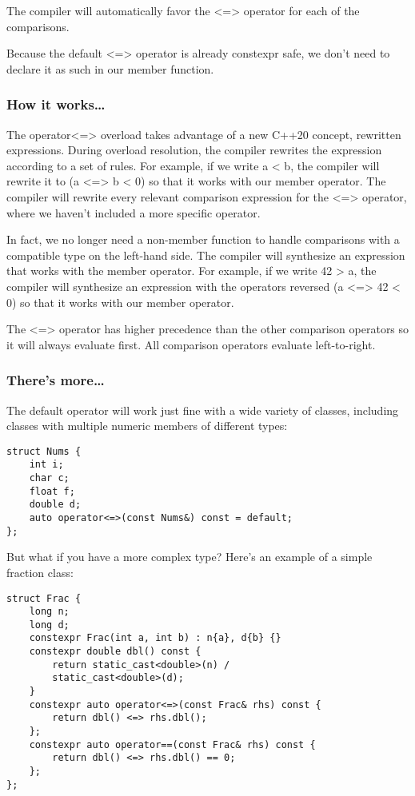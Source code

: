 The compiler will automatically favor the <=> operator for each of the comparisons.

Because the default <=> operator is already constexpr safe, we don't need to declare it as such in our member function.

\subsubsection{How it works…}

The operator<=> overload takes advantage of a new C++20 concept, rewritten expressions. During overload resolution, the compiler rewrites the expression according to a set of rules. For example, if we write a < b, the compiler will rewrite it to (a <=> b < 0) so that it works with our member operator. The compiler will rewrite every relevant comparison expression for the <=> operator, where we haven't included a more specific operator.

In fact, we no longer need a non-member function to handle comparisons with a compatible type on the left-hand side. The compiler will synthesize an expression that works with the member operator. For example, if we write 42 > a, the compiler will synthesize an expression with the operators reversed (a <=> 42 < 0) so that it works with our member operator.

\begin{tcolorbox}[colback=webgreen!5!white,colframe=webgreen!75!black,title=Note]
The <=> operator has higher precedence than the other comparison operators
so it will always evaluate first. All comparison operators evaluate left-to-right.
\end{tcolorbox}

\subsubsection{There's more…}

The default operator will work just fine with a wide variety of classes, including classes with multiple numeric members of different types:

\begin{lstlisting}[style=styleCXX]
struct Nums {
	int i;
	char c;
	float f;
	double d;
	auto operator<=>(const Nums&) const = default;
};
\end{lstlisting}

But what if you have a more complex type? Here's an example of a simple fraction class:

\begin{lstlisting}[style=styleCXX]
struct Frac {
	long n;
	long d;
	constexpr Frac(int a, int b) : n{a}, d{b} {}
	constexpr double dbl() const {
		return static_cast<double>(n) /
		static_cast<double>(d);
	}
	constexpr auto operator<=>(const Frac& rhs) const {
		return dbl() <=> rhs.dbl();
	};
	constexpr auto operator==(const Frac& rhs) const {
		return dbl() <=> rhs.dbl() == 0;
	};
};
\end{lstlisting}

